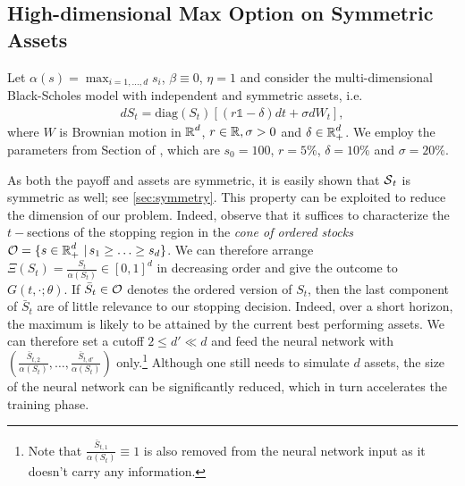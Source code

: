 

\subsection{High-dimensional Max Option on Symmetric Assets}\label{sec:maxCallSym}
Let $\alpha(s) = \max_{i=1,...,d}s_i$, $\beta\equiv 0$, $\eta=1$ and consider the multi-dimensional Black-Scholes model with independent and symmetric assets, i.e. 
\begin{align}\label{eq:BSAsym}
    d S_t = \text{diag}(S_t) \left[ (r\mathds{1} - \delta)dt + \sigma dW_t\right],
\end{align}
where $W$ is Brownian motion in $\operatorname{\mathbb{R}}^d$, $r \in \operatorname{\mathbb{R}} ,\sigma > 0$ and $\delta \in \operatorname{\mathbb{R}}_+^d$. We employ the parameters from Section of \cite{Becker2}, which are $s_0 =100 $, $r=5\%$, $\delta =10\%$ and $\sigma = 20 \%$. 

As both the payoff and assets are symmetric, it is easily shown that  $\operatorname{\mathcal{S}}_t$ is symmetric as well; see \cref{sec:symmetry}. This property can be exploited to reduce the dimension of our problem. Indeed, observe that it suffices to characterize the $t-$sections of the stopping region in the \textit{cone of ordered stocks}  
 $\operatorname{\mathcal{O}} = \{s\in \operatorname{\mathbb{R}}_+^d \,|\, s_1 \geq \ldots \geq s_d\}$. We can therefore arrange $\Xi(S_t) = \frac{S_t}{\alpha(S_t)}\in [0,1]^d$ in decreasing order and give the outcome to $G(t,\cdot; \theta)$. If $\bar{S}_t \in \operatorname{\mathcal{O}}$ denotes the ordered version of $S_t$, then the last component of $\bar{S}_t$ are of little relevance to our stopping decision. 
 Indeed, over a short horizon, the maximum is  likely to be attained by the current best performing assets. %
 We can therefore set a cutoff $2 \le d' \ll d$ and feed the neural network with $(\frac{\bar{S}_{t,2}}{\alpha(S_t)},\ldots,\frac{\bar{S}_{t,d'}}{\alpha(S_t)})$ only.\footnote{Note that $\frac{\bar{S}_{t,1}}{\alpha(S_t)} \equiv 1$ is also removed from the neural network input as it doesn't carry any information.} Although one still needs to simulate $d$ assets, the size of the neural network can be significantly reduced, which in turn accelerates the training phase.  
 
